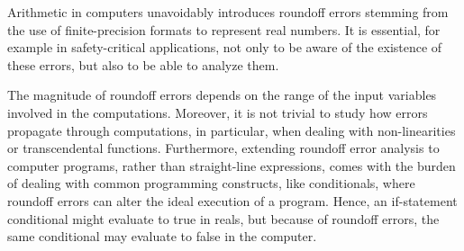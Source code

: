%

Arithmetic in computers unavoidably introduces roundoff errors stemming from the use of finite-precision formats to represent real numbers.
%
It is essential, for example in safety-critical applications, not only to be aware of the existence of these errors, but also to be able to analyze them.

%
%
%

%
The magnitude of roundoff errors depends on the range of the input variables involved in the computations.
%
Moreover, it is not trivial to study how errors propagate through computations, in particular, when dealing with non-linearities or transcendental functions.
%
Furthermore, extending roundoff error analysis to computer programs, rather than straight-line expressions, comes with the burden of dealing with common programming constructs, like conditionals, where roundoff errors can alter the ideal execution of a program. 
%
Hence, an if-statement conditional might evaluate to true in reals, but because of roundoff errors, the same conditional may evaluate to false in the computer. 
%
%
%
%
%

